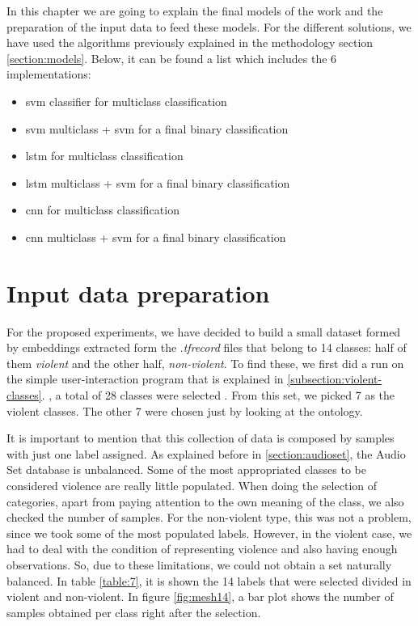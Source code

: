 
	In this chapter we are going to explain the final models of the work and the preparation of the input data to feed these models. For the different solutions, we have used the algorithms previously explained in the methodology section \ref{section:models}. Below, it can be found a list which includes the 6 implementations:
	
	\begin{itemize}
		\item \acrshort{svm} classifier for multiclass classification
		\item \acrshort{svm} multiclass + \acrshort{svm} for a final binary classification
		\item \acrshort{lstm} for multiclass classification
		\item \acrshort{lstm} multiclass + \acrshort{svm} for a final binary classification
		\item \acrshort{cnn} for multiclass classification
		\item \acrshort{cnn} multiclass + \acrshort{svm} for a final binary classification
	\end{itemize}
	

\section{Input data preparation}
\label{section:input-data-preparation}

	For the proposed experiments, we have decided to build a small dataset formed by embeddings extracted form the .\textit{tfrecord} files that belong to 14 classes: half of them \textit{violent} and the other half, \textit{non-violent}. To find these, we first did a run on the simple user-interaction program that is explained in \ref{subsection:violent-classes}. , a total of 28 classes were selected . From this set, we picked 7 as the violent classes. The other 7 were chosen just by looking at the ontology.
	
	It is important to mention that this collection of data is composed by samples with just one label assigned. As explained before in \ref{section:audioset}, the Audio Set database is unbalanced. Some of the most appropriated classes to be considered violence are really little populated. When doing the selection of categories, apart from paying attention to the own meaning of the class, we also checked the number of samples. For the non-violent type, this was not a problem, since we took some of the most populated labels. However, in the violent case, we had to deal with the condition of representing violence and also having enough observations. So, due to these limitations, we could not obtain a set naturally balanced. In table \ref{table:7}, it is shown the 14 labels that were selected divided in violent and non-violent. In figure \ref{fig:mesh14}, a bar plot shows the number of samples obtained per class right after the selection. 
	
